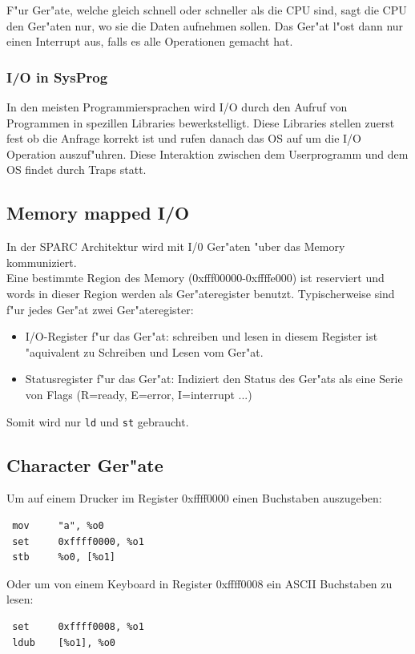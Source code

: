 \documentclass[german, 10pt, a4paper, twocolumn]{scrartcl}
\begin{document}
F"ur Ger"ate, welche gleich schnell oder schneller als die CPU sind, sagt die CPU den Ger"aten nur, wo sie die Daten aufnehmen sollen. Das Ger"at l"ost dann nur einen Interrupt aus, falls es alle Operationen gemacht hat.

\subsubsection{I/O in SysProg}

In den meisten Programmiersprachen wird I/O durch den Aufruf von Programmen in spezillen Libraries bewerkstelligt. Diese Libraries stellen zuerst fest ob die Anfrage korrekt ist und rufen danach das OS auf um die I/O Operation auszuf"uhren. Diese Interaktion zwischen dem Userprogramm und dem OS findet durch Traps statt.

\subsection{Memory mapped I/O}

In der SPARC Architektur wird mit I/0 Ger"aten "uber das Memory kommuniziert.\\

Eine bestimmte Region des Memory (0xfff00000-0xffffe000) ist reserviert und words in dieser Region werden als Ger"ateregister benutzt. Typischerweise sind f"ur jedes Ger"at zwei Ger"ateregister:
\begin{itemize}
	\item I/O-Register f"ur das Ger"at: schreiben und lesen in diesem Register ist "aquivalent zu Schreiben und Lesen vom Ger"at.
	\item Statusregister f"ur das Ger"at: Indiziert den Status des Ger"ats als eine Serie von Flags (R=ready, E=error, I=interrupt ...)
\end{itemize}

Somit wird nur \verb#ld# und \verb#st# gebraucht.

\subsection{Character Ger"ate}

Um auf einem Drucker im Register 0xffff0000 einen Buchstaben auszugeben:
\begin{verbatim}
 mov     "a", %o0
 set     0xffff0000, %o1
 stb     %o0, [%o1]
\end{verbatim}

Oder um von einem Keyboard in Register 0xffff0008 ein ASCII Buchstaben zu lesen:
\begin{verbatim}
 set     0xffff0008, %o1
 ldub    [%o1], %o0
\end{verbatim}
\end{document}
